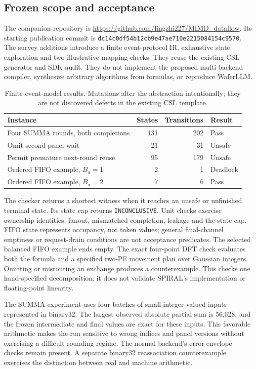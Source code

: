 \documentclass[final,3p,times,authoryear]{elsarticle}
\begin{document}
\subsection{Frozen scope and acceptance}
The companion repository is \url{https://github.com/lingzhi227/MIMD_dataflow}. Its starting publication commit is \texttt{dc14c0df54b12cb9e47ae710e2215084154c9570}. The survey additions introduce a finite event-protocol IR, exhaustive state exploration and two illustrative mapping checks. They reuse the existing CSL generator and SDK audit. They do not implement the proposed multi-backend compiler, synthesize arbitrary algorithms from formulas, or reproduce WaferLLM.

\begin{table}[ht]
\caption{Finite event-model results. Mutations alter the abstraction intentionally; they are not discovered defects in the existing CSL template.}
\label{tab:checks}
\small
\begin{tabularx}{\linewidth}{@{}Xrrl@{}}
\toprule
Instance & States & Transitions & Result \\
\midrule
Four SUMMA rounds, both completions & 131 & 202 & Pass \\
Omit second-panel wait & 21 & 31 & Unsafe \\
Permit premature next-round reuse & 95 & 179 & Unsafe \\
Ordered FIFO example, $B_a=1$ & 2 & 1 & Deadlock \\
Ordered FIFO example, $B_a=2$ & 7 & 6 & Pass \\
\bottomrule
\end{tabularx}
\end{table}

The checker returns a shortest witness when it reaches an unsafe or unfinished terminal state. Its state cap returns \texttt{INCONCLUSIVE}. Unit checks exercise ownership identities, fanout, mismatched completion, leakage and the state cap. FIFO state represents occupancy, not token values; general final-channel emptiness or request-drain conditions are not acceptance predicates. The selected balanced FIFO example ends empty. The exact four-point DFT check evaluates both the formula and a specified two-PE movement plan over Gaussian integers. Omitting or misrouting an exchange produces a counterexample. This checks one hand-specified decomposition; it does not validate SPIRAL's implementation or floating-point linearity.

The SUMMA experiment uses four batches of small integer-valued inputs represented in binary32. The largest observed absolute partial sum is 56,628, and the frozen intermediate and final values are exact for these inputs. This favorable arithmetic makes the run sensitive to wrong indices and panel versions without exercising a difficult rounding regime. The normal backend's error-envelope checks remain present. A separate binary32 reassociation counterexample exercises the distinction between real and machine arithmetic.
\end{document}
